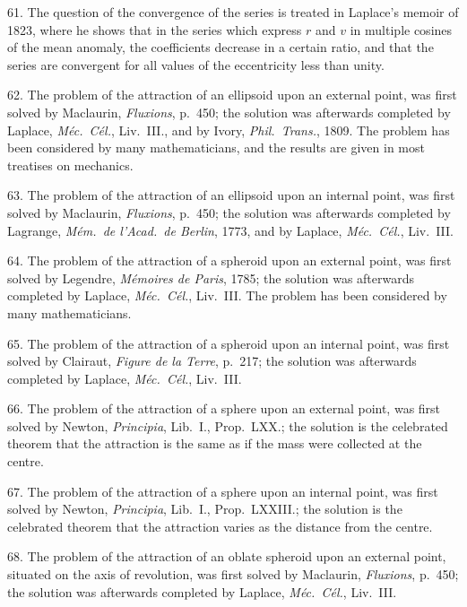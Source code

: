 \documentclass[11pt,a4paper]{article}
\begin{document}
61. The question of the convergence of the series is treated in Laplace's memoir of 1823, where he shows that in the series which express $r$ and $v$ in multiple cosines of the mean anomaly, the coefficients decrease in a certain ratio, and that the series are convergent for all values of the eccentricity less than unity.

62. The problem of the attraction of an ellipsoid upon an external point, was first solved by Maclaurin, \textit{Fluxions}, p.~450; the solution was afterwards completed by Laplace, \textit{M\'ec.\ C\'el.}, Liv.~III., and by Ivory, \textit{Phil.\ Trans.}, 1809. The problem has been considered by many mathematicians, and the results are given in most treatises on mechanics.

63. The problem of the attraction of an ellipsoid upon an internal point, was first solved by Maclaurin, \textit{Fluxions}, p.~450; the solution was afterwards completed by Lagrange, \textit{M\'em.\ de l'Acad.\ de Berlin}, 1773, and by Laplace, \textit{M\'ec.\ C\'el.}, Liv.~III.

\newpage
\setcounter{page}{530}

64. The problem of the attraction of a spheroid upon an external point, was first solved by Legendre, \textit{M\'emoires de Paris}, 1785; the solution was afterwards completed by Laplace, \textit{M\'ec.\ C\'el.}, Liv.~III. The problem has been considered by many mathematicians.

65. The problem of the attraction of a spheroid upon an internal point, was first solved by Clairaut, \textit{Figure de la Terre}, p.~217; the solution was afterwards completed by Laplace, \textit{M\'ec.\ C\'el.}, Liv.~III.

66. The problem of the attraction of a sphere upon an external point, was first solved by Newton, \textit{Principia}, Lib.~I., Prop.~LXX.; the solution is the celebrated theorem that the attraction is the same as if the mass were collected at the centre.

67. The problem of the attraction of a sphere upon an internal point, was first solved by Newton, \textit{Principia}, Lib.~I., Prop.~LXXIII.; the solution is the celebrated theorem that the attraction varies as the distance from the centre.

68. The problem of the attraction of an oblate spheroid upon an external point, situated on the axis of revolution, was first solved by Maclaurin, \textit{Fluxions}, p.~450; the solution was afterwards completed by Laplace, \textit{M\'ec.\ C\'el.}, Liv.~III.
\end{document}

